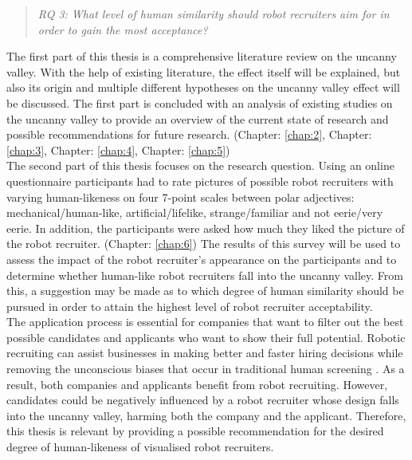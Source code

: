 \begin{quote}\emph{RQ 3: What level of human similarity should robot recruiters aim for in order to gain the most acceptance?}\end{quote} 


The first part of this thesis is a comprehensive literature review on the uncanny valley. With the help of existing literature, the effect itself will be explained, but also its origin and multiple different hypotheses on the uncanny valley effect will be discussed. The first part is concluded with an analysis of existing studies on the uncanny valley to provide an overview of the current state of research and possible recommendations for future research. (Chapter: \ref{chap:2},  Chapter: \ref{chap:3},  Chapter: \ref{chap:4},  Chapter: \ref{chap:5})\\
The second part of this thesis focuses on the research question. Using an online questionnaire participants had to rate pictures of possible robot recruiters with varying human-likeness on four 7-point scales between polar adjectives: mechanical/human-like, artificial/lifelike, strange/familiar and not eerie/very eerie. In addition, the participants were asked how much they liked the picture of the robot recruiter. (Chapter: \ref{chap:6})\newline
The results of this survey will be used to assess the impact of the robot recruiter's appearance on the participants and to determine whether human-like robot recruiters fall into the uncanny valley. From this, a suggestion may be made as to which degree of human similarity should be pursued in order to attain the highest level of robot recruiter acceptability.\\
The application process is essential for companies that want to filter out the best possible candidates and applicants who want to show their full potential. Robotic recruiting can assist businesses in making better and faster hiring decisions while removing the unconscious biases that occur in traditional human screening \cite{robot_recruiting_scholar}. As a result, both companies and applicants benefit from robot recruiting. However, candidates could be negatively influenced by a robot recruiter whose design falls into the uncanny valley, harming both the company and the applicant. Therefore, this thesis is relevant by providing a possible recommendation for the desired degree of human-likeness of visualised robot recruiters.